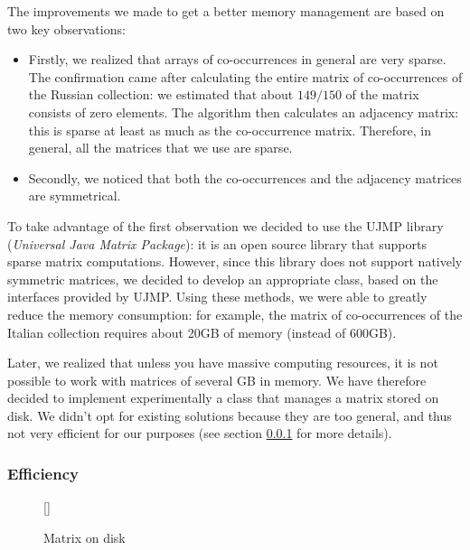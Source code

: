             The improvements we made to get a better memory management are based on two key observations:
            \begin{itemize}
                \item Firstly, we realized that arrays of co-occurrences in general are very sparse. The confirmation came after calculating the entire matrix of co-occurrences of the Russian collection: we estimated that about \(149/150\) of the matrix consists of zero elements. The algorithm then calculates an adjacency matrix: this is sparse at least as much as the co-occurrence matrix. Therefore, in general, all the matrices that we use are sparse.
                \item Secondly, we noticed that both the co-occurrences and the adjacency matrices are symmetrical.
            \end{itemize}
            To take advantage of the first observation we decided to use the UJMP library (\emph{Universal Java Matrix Package})\footnotemark{}: it is an open source library that supports sparse matrix computations. However, since this library does not support natively symmetric matrices, we decided to develop an appropriate class, based on the interfaces provided by UJMP. Using these methods, we were able to greatly reduce the memory consumption: for example, the matrix of co-occurrences of the Italian collection requires about 20GB of memory (instead of 600GB).\par

            Later, we realized that unless you have massive computing resources, it is not possible to work with matrices of several GB in memory. We have therefore decided to implement experimentally a class that manages a matrix stored on disk. We didn't opt for existing solutions because they are too general, and thus not very efficient for our purposes (see section \ref{sec:efficiency} for more details).


        \subsubsection{Efficiency}\label{sec:efficiency}

            \begin{wrapfigure}{R}{0.25\textwidth}
                \centering
                \raisebox{0pt}[\dimexpr{}\baselineskip\relax]{}                
                \caption{\label{img:matrix-memory}Matrix on disk}
            \end{wrapfigure}

